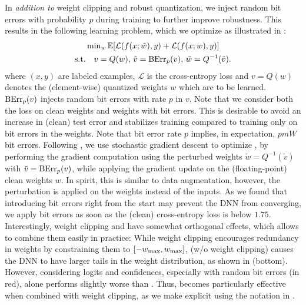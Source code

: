 In \emph{addition to} weight clipping and robust quantization, we inject random bit errors with probability $p$ during training to further improve robustness. This results in the following learning problem, which we optimize as illustrated in :
\begin{align}
	\begin{split}
    	&\min_w \mathbb{E}[\mathcal{L}(f(x; \tilde{w}), y) + \mathcal{L}(f(x; w), y)]\\
    	\text{s.t.}&\quad v = Q(w),\, \tilde{v} = \biterror_p(v),\, \tilde{w} = Q^{-1}(\tilde{v}).
   	\end{split}\label{eq:random-training-average}
\end{align}
where $(x, y)$ are labeled examples, $\mathcal{L}$ is the cross-entropy loss and $v = Q(w)$ denotes the (element-wise) quantized weights $w$ which are to be learned. $\biterror_p(v)$ injects random bit errors with rate $p$ in $v$. Note that we consider both the loss on clean weights and weights with bit errors. This is desirable to avoid an increase in (clean) test error and stabilizes training compared to training only on bit errors in the weights. Note that bit error rate $p$ implies, in expectation, $pmW$ bit errors. Following , we use stochastic gradient descent to optimize , by performing the gradient computation using the perturbed weights $\tilde{w} = Q^{-1}(\tilde{v})$ with $\tilde{v} = \biterror_p(v)$, while applying the gradient update on the (floating-point) clean weights $w$. In spirit, this is similar to data augmentation, however, the perturbation is applied on the weights instead of the inputs. As we found that introducing bit errors right from the start may prevent the DNN from converging, we apply bit errors as soon as the (clean) cross-entropy loss is below $1.75$. Interestingly, weight clipping and \Random have somewhat orthogonal effects, which allows to combine them easily in practice: While weight clipping encourages redundancy in weights by constraining them to $[-\wmax,\wmax]$, %
\Random (w/o weight clipping) causes the DNN to have larger tails in the weight distribution, as shown in  (bottom). However, considering logits and confidences, especially with random bit errors (in {\color{colorbrewer1}red}), \Random alone performs slightly worse than \Clipping[$0.1$]. Thus, \Random becomes particularly effective when combined with weight clipping, as we make explicit using the notation \Random[$\wmax$] in .
